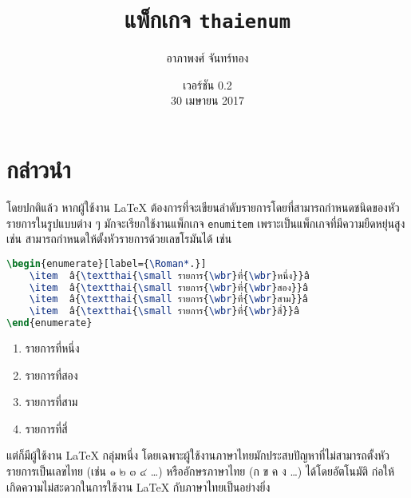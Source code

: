 \documentclass[11pt]{ltxguide}
\title{แพ็ก{\wbr}เก{\wbr}จ \textlatin{\texttt{thaienum}}}
\author{อาภา{\wbr}พงศ์ จันทร์{\wbr}ทอง}
\date{เวอร์ชัน 0.2\\30 เมษายน 2017}
\renewcommand{\baselinestretch}{1.5}
\begin{document}
\maketitle

\section{กล่าว{\wbr}นำ}

โดย{\wbr}ปกติ{\wbr}แล้ว หาก{\wbr}ผู้{\wbr}ใช้งาน \textlatin{\textrm\LaTeX} ต้องการ{\wbr}ที่{\wbr}จะ{\wbr}เขียน{\wbr}ลำดับ{\wbr}รายการ{\wbr}โดย{\wbr}ที่{\wbr}สามารถ{\wbr}กำหนด{\wbr}ชนิด{\wbr}ของ{\wbr}หัว{\wbr}รายการ{\wbr}ใน{\wbr}รูปแบบ{\wbr}ต่าง ๆ มัก{\wbr}จะ{\wbr}เรียก{\wbr}ใช้งาน{\wbr}แพ็ก{\wbr}เก{\wbr}จ \texttt{enumitem} เพราะ{\wbr}เป็น{\wbr}แพ็ก{\wbr}เก{\wbr}จ{\wbr}ที่{\wbr}มี{\wbr}ความ{\wbr}ยืดหยุ่น{\wbr}สูง เช่น สามารถ{\wbr}กำหนด{\wbr}ให้{\wbr}ตั้ง{\wbr}หัว{\wbr}รายการ{\wbr}ด้วย{\wbr}เลข{\wbr}โรมัน{\wbr}ได้ เช่น{\wbr}

\smallskip
\renewcommand{\baselinestretch}{0.1}
\begin{lstlisting}[language=LaTeX,escapechar={â},basicstyle=\ttfamily,lineskip={0.05pc}]
\begin{enumerate}[label={\Roman*.}]
    \item  â{\textthai{\small รายการ{\wbr}ที่{\wbr}หนึ่ง}}â
    \item  â{\textthai{\small รายการ{\wbr}ที่{\wbr}สอง}}â
    \item  â{\textthai{\small รายการ{\wbr}ที่{\wbr}สาม}}â
    \item  â{\textthai{\small รายการ{\wbr}ที่{\wbr}สี่}}â
\end{enumerate}
\end{lstlisting}
\renewcommand{\baselinestretch}{1.5}

\begin{enumerate}[topsep=0pc,itemsep=0pc,label={\latintext\rmfamily\Roman*.}]
    \item รายการ{\wbr}ที่{\wbr}หนึ่ง{\wbr}
    \item รายการ{\wbr}ที่{\wbr}สอง{\wbr}
    \item รายการ{\wbr}ที่{\wbr}สาม{\wbr}
    \item รายการ{\wbr}ที่{\wbr}สี่{\wbr}
\end{enumerate}

\medskip
แต่{\wbr}ก็{\wbr}มี{\wbr}ผู้{\wbr}ใช้งาน \textlatin{\textrm\LaTeX} กลุ่ม{\wbr}หนึ่ง โดย{\wbr}เฉพาะ{\wbr}ผู้{\wbr}ใช้งาน{\wbr}ภาษา{\wbr}ไทย{\wbr}มัก{\wbr}ประสบ{\wbr}ปัญหา{\wbr}ที่{\wbr}ไม่{\wbr}สามารถ{\wbr}ตั้ง{\wbr}หัว{\wbr}รายการ{\wbr}เป็น{\wbr}เลข{\wbr}ไทย (เช่น ๑ ๒ ๓ ๔ \ldots) หรือ{\wbr}อักษร{\wbr}ภาษา{\wbr}ไทย (ก ข ค ง \ldots) ได้{\wbr}โดย{\wbr}อัตโนมัติ ก่อ{\wbr}ให้{\wbr}เกิด{\wbr}ความ{\wbr}ไม่{\wbr}สะดวก{\wbr}ใน{\wbr}การ{\wbr}ใช้งาน \textlatin{\textrm\LaTeX} กับ{\wbr}ภาษา{\wbr}ไทย{\wbr}เป็น{\wbr}อย่าง{\wbr}ยิ่ง{\wbr}
\end{document}
